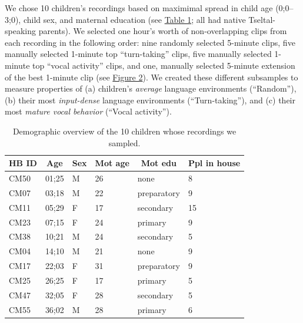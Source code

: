 \documentclass[floatsintext,man]{apa6}
\theoremstyle{definition}
\theoremstyle{definition}
\theoremstyle{definition}
\theoremstyle{remark}
\begin{document}
We chose 10 children's recordings based on maximimal spread in child age
(0;0--3;0), child sex, and maternal education (see
\protect\hyperlink{tab1}{Table 1}; all had native Tseltal-speaking
parents). We selected one hour's worth of non-overlapping clips from
each recording in the following order: nine randomly selected 5-minute
clips, five manually selected 1-minute top \enquote{turn-taking} clips,
five manually selected 1-minute top \enquote{vocal activity} clips, and
one, manually selected 5-minute extension of the best 1-minute clip (see
\protect\hyperlink{fig2}{Figure 2}). We created these different
subsamples to measure properties of (a) children's \emph{average}
language environments (\enquote{Random}), (b) their most
\emph{input-dense} language environments (\enquote{Turn-taking}), and
(c) their most \emph{mature vocal behavior} (\enquote{Vocal activity}).

\begin{table}[tbp]
\begin{center}
\begin{threeparttable}
\caption{\label{tab:tab1}Demographic overview of the 10 children whose recordings we sampled.}
\begin{tabular}{llllll}
\toprule
HB ID & \multicolumn{1}{c}{Age} & \multicolumn{1}{c}{Sex} & \multicolumn{1}{c}{Mot age} & \multicolumn{1}{c}{Mot edu} & \multicolumn{1}{c}{Ppl in house}\\
\midrule
CM50 & 01;25 & M & 26 & none & 8\\
CM07 & 03;18 & M & 22 & preparatory & 9\\
CM11 & 05;29 & F & 17 & secondary & 15\\
CM23 & 07;15 & F & 24 & primary & 9\\
CM38 & 10;21 & M & 24 & secondary & 5\\
CM04 & 14;10 & M & 21 & none & 9\\
CM17 & 22;03 & F & 31 & preparatory & 9\\
CM25 & 26;25 & F & 17 & primary & 5\\
CM47 & 32;05 & F & 28 & secondary & 5\\
CM55 & 36;02 & M & 28 & primary & 6\\
\bottomrule
\end{tabular}
\end{threeparttable}
\end{center}
\end{table}
\end{document}
